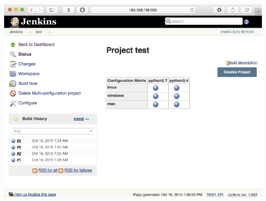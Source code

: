 \documentclass[xcolor=svgnames,17pt]{beamer}
\begin{document}
\begin{frame}[plain]{}
\includegraphics[width=\paperwidth,frame,center]{hello-8-matrix.png}
\end{frame}
\end{document}
